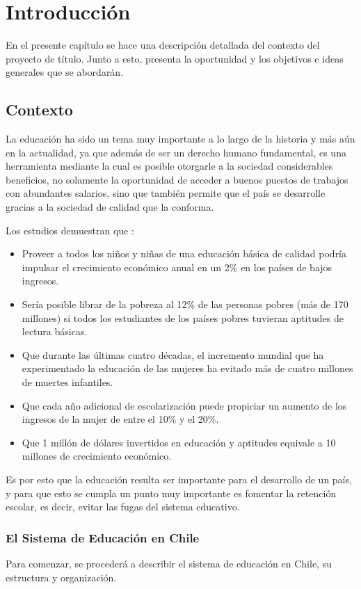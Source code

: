 \chapter{Introducción}
En el presente capítulo se hace una descripción detallada del contexto del proyecto de título. Junto a esto, presenta la oportunidad y los objetivos e ideas generales que se abordarán.

\section{Contexto}
La educación ha sido un tema muy importante a lo largo de la historia y más aún en la actualidad, ya que además de ser un derecho humano fundamental, es una herramienta mediante la cual es posible otorgarle a la sociedad considerables beneficios, no solamente la oportunidad de acceder a buenos puestos de trabajos con abundantes salarios, sino que también permite que el país se desarrolle gracias a la sociedad de calidad que la conforma. 

Los estudios demuestran que \cite{unicef}:
\begin{itemize}
\item Proveer a todos los niños y niñas de una educación básica de calidad podría impulsar el crecimiento económico anual en un 2\% en los países de bajos ingresos.
\item Sería posible librar de la pobreza al 12\% de las personas pobres (más de 170 millones) si todos los estudiantes de los países pobres tuvieran aptitudes de lectura básicas.
\item Que durante las últimas cuatro décadas, el incremento mundial que ha experimentado la educación de las mujeres ha evitado más de cuatro millones de muertes infantiles.
\item Que cada año adicional de escolarización puede propiciar un aumento de los ingresos de la mujer de entre el 10\% y el 20\%.
\item Que 1 millón de dólares invertidos en educación y aptitudes equivale a 10 millones de crecimiento económico.
\end{itemize}

Es por esto que la educación resulta ser importante para el desarrollo de un país, y para que esto se cumpla un punto muy importante es fomentar la retención escolar, es decir, evitar las fugas del sistema educativo. 

\subsection{El Sistema de Educación en Chile}
Para comenzar, se procederá a describir el sistema de educación en Chile, su estructura y organización.

